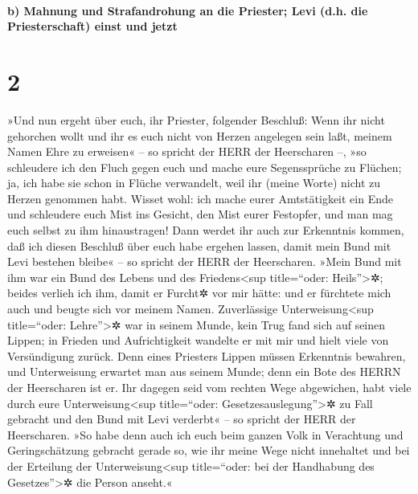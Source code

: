 \hypertarget{b-mahnung-und-strafandrohung-an-die-priester-levi-d.h.-die-priesterschaft-einst-und-jetzt}{%
\paragraph{b) Mahnung und Strafandrohung an die Priester; Levi (d.h. die
Priesterschaft) einst und
jetzt}\label{b-mahnung-und-strafandrohung-an-die-priester-levi-d.h.-die-priesterschaft-einst-und-jetzt}}

\hypertarget{section-1}{%
\section{2}\label{section-1}}

 »Und nun ergeht über euch, ihr Priester, folgender
Beschluß:  Wenn ihr nicht gehorchen wollt und ihr es euch
nicht von Herzen angelegen sein laßt, meinem Namen Ehre zu erweisen« --
so spricht der HERR der Heerscharen --, »so schleudere ich den Fluch
gegen euch und mache eure Segenssprüche zu Flüchen; ja, ich habe sie
schon in Flüche verwandelt, weil ihr (meine Worte) nicht zu Herzen
genommen habt.  Wisset wohl: ich mache eurer Amtstätigkeit
ein Ende und schleudere euch Mist ins Gesicht, den Mist eurer Festopfer,
und man mag euch selbst zu ihm hinaustragen!  Dann werdet
ihr auch zur Erkenntnis kommen, daß ich diesen Beschluß über euch habe
ergehen lassen, damit mein Bund mit Levi bestehen bleibe« -- so spricht
der HERR der Heerscharen.  »Mein Bund mit ihm war ein Bund
des Lebens und des Friedens\textless sup title=``oder:
Heils''\textgreater✲; beides verlieh ich ihm, damit er Furcht✲ vor mir
hätte: und er fürchtete mich auch und beugte sich vor meinem Namen.
 Zuverlässige Unterweisung\textless sup title=``oder:
Lehre''\textgreater✲ war in seinem Munde, kein Trug fand sich auf seinen
Lippen; in Frieden und Aufrichtigkeit wandelte er mit mir und hielt
viele von Versündigung zurück.  Denn eines Priesters
Lippen müssen Erkenntnis bewahren, und Unterweisung erwartet man aus
seinem Munde; denn ein Bote des HERRN der Heerscharen ist er.
 Ihr dagegen seid vom rechten Wege abgewichen, habt viele
durch eure Unterweisung\textless sup title=``oder:
Gesetzesauslegung''\textgreater✲ zu Fall gebracht und den Bund mit Levi
verderbt« -- so spricht der HERR der Heerscharen.  »So
habe denn auch ich euch beim ganzen Volk in Verachtung und
Geringschätzung gebracht gerade so, wie ihr meine Wege nicht innehaltet
und bei der Erteilung der Unterweisung\textless sup title=``oder: bei
der Handhabung des Gesetzes''\textgreater✲ die Person anseht.«

